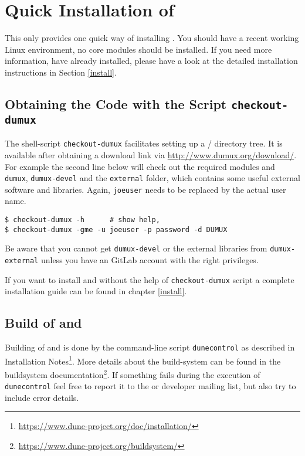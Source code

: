 \section{Quick Installation of \Dumux}
\label{quick-install}

This only provides one quick way of installing \Dumux.
You should have a recent working Linux environment, no \Dune core modules should be installed.
If you need more information,
have \Dune already installed, please have a look at the detailed installation
instructions in Section \ref{install}.

\subsection{Obtaining the Code with the Script \texttt{checkout-dumux}}

The shell-script \texttt{checkout-dumux}
facilitates setting up a {\Dune}/{\Dumux} directory tree.
It is available after obtaining a download link via \url{http://www.dumux.org/download/}.
For example the second line below will check out the required \Dune modules and \texttt{dumux},
\texttt{dumux-devel} and the \texttt{external} folder, which contains some useful external software and libraries.
Again,  \texttt{joeuser} needs to be replaced by the actual user name.
\begin{lstlisting}[style=Bash]
$ checkout-dumux -h      # show help,
$ checkout-dumux -gme -u joeuser -p password -d DUMUX
\end{lstlisting}

Be aware that you cannot get \texttt{dumux-devel} or the external libraries from \texttt{dumux-external} unless
you have an GitLab account with the right privileges.

If you want to install \Dune and \Dumux without the help of \texttt{checkout-dumux} script a complete installation
guide can be found in chapter \ref{install}.

\subsection{Build of \Dune and \Dumux}
\label{buildIt}
Building of \Dune and \Dumux is done by the command-line script \texttt{dunecontrol} as described in
\Dune Installation Notes\footnote{\url{https://www.dune-project.org/doc/installation/}}.
More details about the build-system can be found in the \Dune buildsystem documentation\footnote{\url{https://www.dune-project.org/buildsystem/}}.
If something fails during the execution of \texttt{dunecontrol} feel free to report it to the \Dune or \Dumux developer mailing list,
but also try to include error details.

